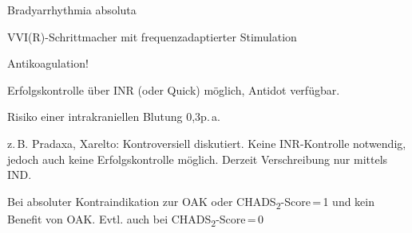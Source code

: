 \TextSlide
{Bradyarrhythmia absoluta}%
{VVI(R)-Schrittmacher mit frequenzadaptierter Stimulation

}%
{}%

\TextSlide
{Antikoagulation!}%
{
Erfolgskontrolle über INR (oder Quick)  möglich, Antidot
verfügbar.

Risiko einer
intrakraniellen Blutung 0,3\PC p.\,a.


 z.\,B. Pradaxa, Xarelto: Kontroversiell diskutiert. Keine
INR-Kontrolle notwendig, jedoch auch keine Erfolgskontrolle
möglich. Derzeit Verschreibung nur mittels IND.

 Bei absoluter Kontraindikation zur OAK oder
CHADS\textsubscript{2}-Score\,=\,1 und kein Benefit von OAK. Evtl. auch bei CHADS\textsubscript{2}-Score\,=\,0
}%
{}%





\ChapterEnd